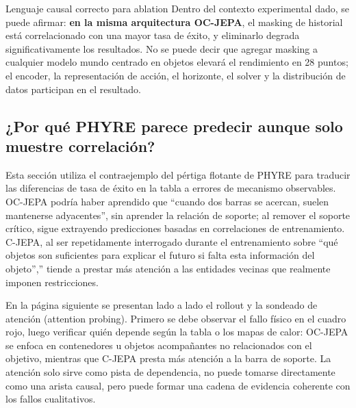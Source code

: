 

\begin{importantbox}{Lenguaje causal correcto para ablation}
Dentro del contexto experimental dado, se puede afirmar: \textbf{en la misma arquitectura OC-JEPA}, el masking de historial está correlacionado con una mayor tasa de éxito, y eliminarlo degrada significativamente los resultados. No se puede decir que agregar masking a cualquier modelo mundo centrado en objetos elevará el rendimiento en 28 puntos; el encoder, la representación de acción, el horizonte, el solver y la distribución de datos participan en el resultado.
\end{importantbox}

\subsection{¿Por qué PHYRE parece predecir aunque solo muestre correlación?}

Esta sección utiliza el contraejemplo del pértiga flotante de PHYRE para traducir las diferencias de tasa de éxito en la tabla a errores de mecanismo observables. OC-JEPA podría haber aprendido que ``cuando dos barras se acercan, suelen mantenerse adyacentes'', sin aprender la relación de soporte; al remover el soporte crítico, sigue extrayendo predicciones basadas en correlaciones de entrenamiento. C-JEPA, al ser repetidamente interrogado durante el entrenamiento sobre ``qué objetos son suficientes para explicar el futuro si falta esta información del objeto'','' tiende a prestar más atención a las entidades vecinas que realmente imponen restricciones.


En la página siguiente se presentan lado a lado el rollout y la sondeado de atención (attention probing). Primero se debe observar el fallo físico en el cuadro rojo, luego verificar quién depende según la tabla o los mapas de calor: OC-JEPA se enfoca en contenedores u objetos acompañantes no relacionados con el objetivo, mientras que C-JEPA presta más atención a la barra de soporte. La atención solo sirve como pista de dependencia, no puede tomarse directamente como una arista causal, pero puede formar una cadena de evidencia coherente con los fallos cualitativos.

